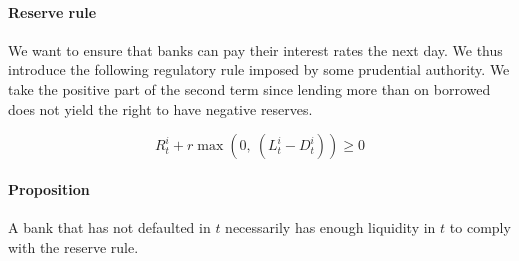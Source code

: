 \documentclass{article}
\newcommand{\othernote}[1]{\textcolor{darkgreen}{\textit{Dimitri: #1}}}
\begin{document}


\paragraph{Reserve rule}
We want to ensure that banks can pay their interest rates the next day. We thus introduce the following regulatory rule imposed by some prudential authority. We take the positive part of the second term since lending more than on borrowed does not yield the right to have negative reserves.

\begin{equation}\label{eq:rsvrule}
R_t^i + r \max(0,~(L_t^i - D_t^i)) \geq 0
\end{equation}


\paragraph{Proposition} A bank that has not defaulted in $t$ necessarily has enough liquidity in $t$ to comply with the reserve rule.
\end{document}
